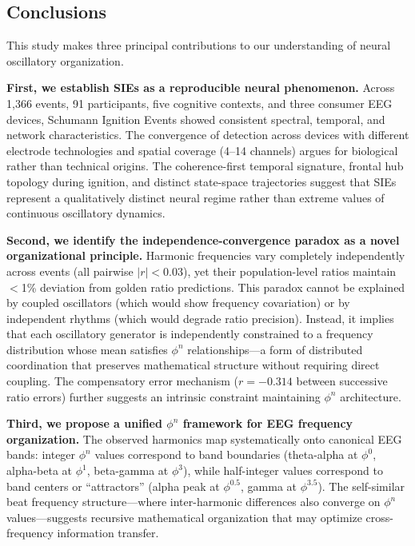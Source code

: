 \documentclass[11pt,a4paper]{article}
\begin{document}
\subsection{Conclusions}

This study makes three principal contributions to our understanding of neural oscillatory organization.

\textbf{First, we establish SIEs as a reproducible neural phenomenon.} Across 1,366 events, 91 participants, five cognitive contexts, and three consumer EEG devices, Schumann Ignition Events showed consistent spectral, temporal, and network characteristics. The convergence of detection across devices with different electrode technologies and spatial coverage (4–14 channels) argues for biological rather than technical origins. The coherence-first temporal signature, frontal hub topology during ignition, and distinct state-space trajectories suggest that SIEs represent a qualitatively distinct neural regime rather than extreme values of continuous oscillatory dynamics.

\textbf{Second, we identify the independence-convergence paradox as a novel organizational principle.} Harmonic frequencies vary completely independently across events (all pairwise $|r| < 0.03$), yet their population-level ratios maintain $<$1\% deviation from golden ratio predictions. This paradox cannot be explained by coupled oscillators (which would show frequency covariation) or by independent rhythms (which would degrade ratio precision). Instead, it implies that each oscillatory generator is independently constrained to a frequency distribution whose mean satisfies $\phi^n$ relationships—a form of distributed coordination that preserves mathematical structure without requiring direct coupling. The compensatory error mechanism ($r = -0.314$ between successive ratio errors) further suggests an intrinsic constraint maintaining $\phi^n$ architecture.

\textbf{Third, we propose a unified $\phi^n$ framework for EEG frequency organization.} The observed harmonics map systematically onto canonical EEG bands: integer $\phi^n$ values correspond to band boundaries (theta-alpha at $\phi^0$, alpha-beta at $\phi^1$, beta-gamma at $\phi^3$), while half-integer values correspond to band centers or ``attractors'' (alpha peak at $\phi^{0.5}$, gamma at $\phi^{3.5}$). The self-similar beat frequency structure—where inter-harmonic differences also converge on $\phi^n$ values—suggests recursive mathematical organization that may optimize cross-frequency information transfer.
\end{document}
